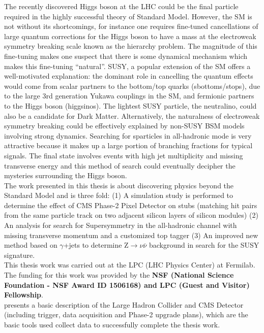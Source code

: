 The recently discovered Higgs boson at the LHC could be the final particle required in the highly successful theory of Standard Model. However, the SM is not without its shortcomings, for instance one requires fine-tuned cancellations of large quantum corrections for the Higgs boson to have a mass at the electroweak symmetry breaking scale known as the hierarchy problem. The magnitude of this fine-tuning makes one suspect that there is some dynamical mechanism which makes this fine-tuning ``natural''. SUSY, a popular extension of the SM offers a well-motivated explanation: the dominant role in cancelling the quantum effects would come from scalar partners to the bottom/top quarks (sbottoms/stops), due to the large 3rd generation Yukawa couplings in the SM, and fermionic partners to the Higgs boson (higgsinos). The lightest SUSY particle, the neutralino, could also be a candidate for Dark Matter. Alternatively, the naturalness of electroweak symmetry breaking could be effectively explained by non-SUSY BSM models involving strong dynamics. Searching for sparticles in all-hadronic mode is very attractive because it makes up a large portion of branching fractions for typical signals. The final state involves events with high jet multiplicity and missing transverse energy and this method of search could eventually decipher the mysteries surrounding the Higgs boson.\\

The work presented in this thesis is about discovering physics beyond the Standard Model and is three fold: (1) A simulation study is performed to determine the effect of CMS Phase-2 Pixel Detector on stubs (matching hit pairs from the same particle track on two adjacent silicon layers of silicon modules) (2) An analysis for search for Supersymmetry in the all-hadronic channel with missing transverse momentum and a customized top tagger (3) An improved new method based on $\gamma$+jets to determine Z$\rightarrow\nu \bar{\nu}$ background in search for the SUSY signature.\\

This thesis work was carried out at the LPC (LHC Physics Center) at Fermilab. The funding for this work was provided by the \textbf{NSF (National Science Foundation - NSF Award ID 1506168) and LPC (Guest and Visitor) Fellowship}.\\

 presents a basic description of the Large Hadron Collider and CMS Detector (including trigger, data acquisition and Phase-2 upgrade plans), which are the basic tools used collect data to successfully complete the thesis work.\\ 

